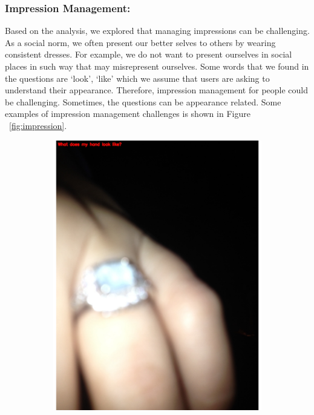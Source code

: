 \documentclass[sigconf]{acmart}
\begin{document}
\subsubsection{Impression Management:} Based on the analysis, we explored that managing impressions can be challenging. As a social norm, we often present our better selves to others by wearing consistent dresses. For example, we do not want to present ourselves in social places in such way that may misrepresent ourselves. Some words that we found in the questions are `look', `like' which we assume that users are asking to understand their appearance. Therefore, impression management for people could be challenging. Sometimes, the questions can be appearance related. Some examples of impression management challenges is shown in Figure ~\ref{fig:impression}.
\begin{figure}[hbp]
        \centering
        \begin{subfigure}[b]{0.45\columnwidth}
                \includegraphics[width=\textwidth]{images/impression_1.pdf}  

\end{subfigure}
\end{figure}
\end{document}
